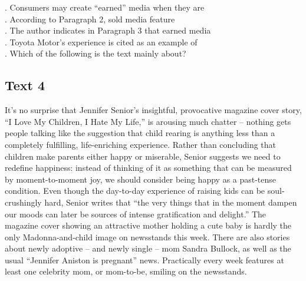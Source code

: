  \begin{questions} . Consumers may create “earned” media when they are
 \\ . According to Paragraph 2, sold media feature
 \\ . The author indicates in Paragraph 3 that earned media
 \\ . Toyota Motor’s experience is cited as an example of
 \\ . Which of the following is the text mainly about?
 \\ \end{questions}      \subsection{Text 4}
 It’s no surprise that Jennifer Senior’s insightful, provocative magazine cover story, “I Love My Children, I Hate My Life,” is arousing much chatter – nothing gets people talking like the suggestion that child rearing is anything less than a completely fulfilling, life-enriching experience. Rather than concluding that children make parents either happy or miserable, Senior suggests we need to redefine happiness: instead of thinking of it as something that can be measured by moment-to-moment joy, we should consider being happy as a past-tense condition. Even though the day-to-day experience of raising kids can be soul-crushingly hard, Senior writes that “the very things that in the moment dampen our moods can later be sources of intense gratification and delight.”
 The magazine cover showing an attractive mother holding a cute baby is hardly the only Madonna-and-child image on newsstands this week. There are also stories about newly adoptive – and newly single – mom Sandra Bullock, as well as the usual “Jennifer Aniston is pregnant” news. Practically every week features at least one celebrity mom, or mom-to-be, smiling on the newsstands.
